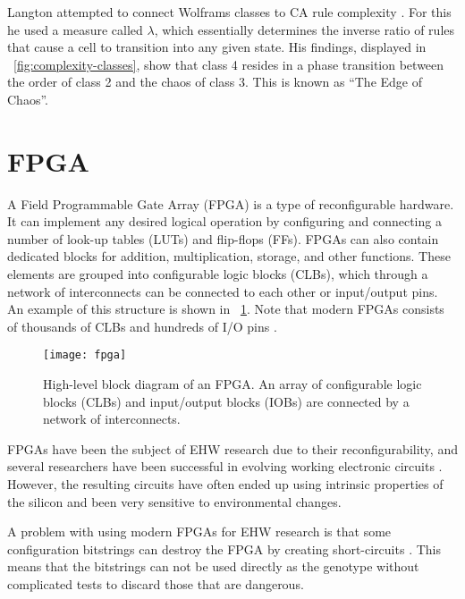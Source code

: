 Langton attempted to connect Wolframs classes to CA rule complexity \cite{langton1990edgeofchaos}.
For this he used a measure called $\lambda$, which essentially determines the inverse ratio of rules that cause a cell to transition into any given state.
His findings, displayed in \figurename~\ref{fig:complexity-classes}, show that class 4 resides in a phase transition between the order of class 2 and the chaos of class 3.
This is known as ``The Edge of Chaos''.



\section{FPGA}

A Field Programmable Gate Array (FPGA) is a type of reconfigurable hardware.
It can implement any desired logical operation by configuring and connecting a number of look-up tables (LUTs) and flip-flops (FFs).
FPGAs can also contain dedicated blocks for addition, multiplication, storage, and other functions.
These elements are grouped into configurable logic blocks (CLBs), which through a network of interconnects can be connected to each other or input/output pins.
An example of this structure is shown in \figurename~\ref{fig:fpga}.
Note that modern FPGAs consists of thousands of CLBs and hundreds of I/O pins \cite{ds160}.

\begin{figure}[!ht]
    \centering
    \texttt{[image: fpga]}
    \caption[FPGA]{
        High-level block diagram of an FPGA.
        An array of configurable logic blocks (CLBs) and input/output blocks (IOBs) are connected by a network of interconnects.
    }
    \label{fig:fpga}
\end{figure}

FPGAs have been the subject of EHW research due to their reconfigurability, and several researchers have been successful in evolving working electronic circuits \cite{huelsbergen1998evolution, thompson1997evolved}.
However, the resulting circuits have often ended up using intrinsic properties of the silicon and been very sensitive to environmental changes.

A problem with using modern FPGAs for EHW research is that some configuration bitstrings can destroy the FPGA by creating short-circuits \cite{xapp151, ug380}.
This means that the bitstrings can not be used directly as the genotype without complicated tests to discard those that are dangerous.

